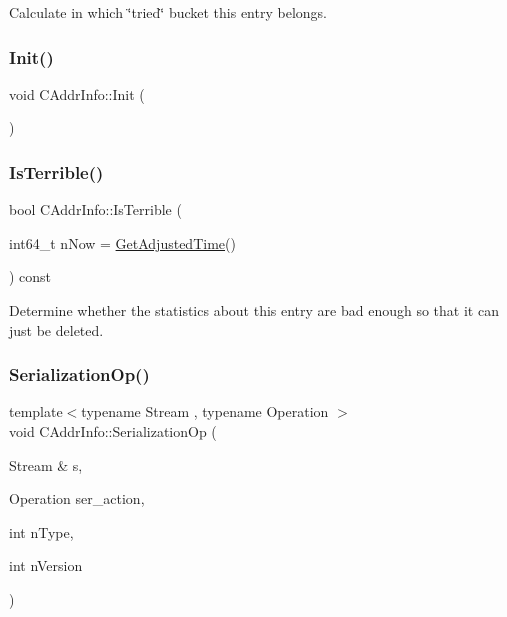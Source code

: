 Calculate in which \char`\"{}tried\char`\"{} bucket this entry belongs. 

\mbox{\label{class_c_addr_info_af1df1f12bc71ed7f3debae61058b9b9f}} 
\subsubsection{\texorpdfstring{Init()}{Init()}}
{\footnotesize\ttfamily void C\+Addr\+Info\+::\+Init (\begin{DoxyParamCaption}{ }\end{DoxyParamCaption})\hspace{0.3cm}{\ttfamily [inline]}}

\mbox{\label{class_c_addr_info_a600725db90b879aee92128a3409af8aa}} 
\subsubsection{\texorpdfstring{Is\+Terrible()}{IsTerrible()}}
{\footnotesize\ttfamily bool C\+Addr\+Info\+::\+Is\+Terrible (\begin{DoxyParamCaption}\item[{int64\+\_\+t}]{n\+Now = {\ttfamily \mbox{\hyperlink{timedata_8h_a09f81b9c7650f898cf3cf305b87547e6}{Get\+Adjusted\+Time}}()} }\end{DoxyParamCaption}) const}



Determine whether the statistics about this entry are bad enough so that it can just be deleted. 

\mbox{\label{class_c_addr_info_ae80fdec7d3b48278033ea2280f66e68b}} 
\subsubsection{\texorpdfstring{Serialization\+Op()}{SerializationOp()}}
{\footnotesize\ttfamily template$<$typename Stream , typename Operation $>$ \\
void C\+Addr\+Info\+::\+Serialization\+Op (\begin{DoxyParamCaption}\item[{Stream \&}]{s,  }\item[{Operation}]{ser\+\_\+action,  }\item[{int}]{n\+Type,  }\item[{int}]{n\+Version }\end{DoxyParamCaption})\hspace{0.3cm}{\ttfamily [inline]}}



